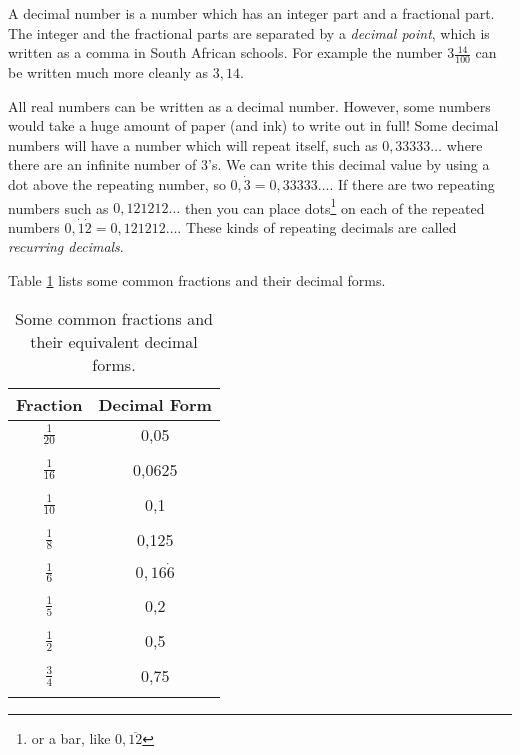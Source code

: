 \documentclass[10pt,a4paper,titlepage,twoside,openright]{report}
\begin{document}

A decimal number is a number which has an integer part and a fractional part.
The integer and the fractional parts are separated by a \textit{decimal point},
which is written as a comma in South African schools. For example the number $3
\frac{14}{100}$ can be written much more cleanly as $3,14$.

All real numbers can be written as a decimal number. However, some numbers would
take a huge amount of paper (and ink) to write out in full! Some decimal numbers
will have a number which will repeat itself, such as $0,33333\ldots$ where there
are an infinite number of 3's. We can write this decimal value by using a dot
above the repeating number, so $0,\Dot3 = 0,33333\ldots$. If there are two
repeating numbers such as $0,121212\ldots$ then you can place dots\footnote{or a
bar, like $0,\overline{12}$} on each of the repeated numbers
$0,\dot1\dot2=0,121212\ldots$. These kinds of repeating decimals are called
\textit{recurring decimals}.

Table \ref{tab:mfoundation:fd:common} lists some common fractions and their
decimal forms.

\begin{table}
\begin{center}
\begin{tabular}{|c|c|}
\hline
Fraction & Decimal Form\\\hline
\hline
$\frac{1}{20}$ & 0,05\\
\\
$\frac{1}{16}$ & 0,0625\\
\\
$\frac{1}{10}$ & 0,1\\
\\
$\frac{1}{8}$ & 0,125\\
\\
$\frac{1}{6}$ & $0,16\dot6$\\
\\
$\frac{1}{5}$ & 0,2\\
\\
$\frac{1}{2}$ & 0,5\\
\\
$\frac{3}{4}$ & 0,75\\
\\
\hline
\end{tabular}
\caption{Some common fractions and their equivalent decimal forms.}
\label{tab:mfoundation:fd:common}
\end{center}
\end{table}
\end{document}
